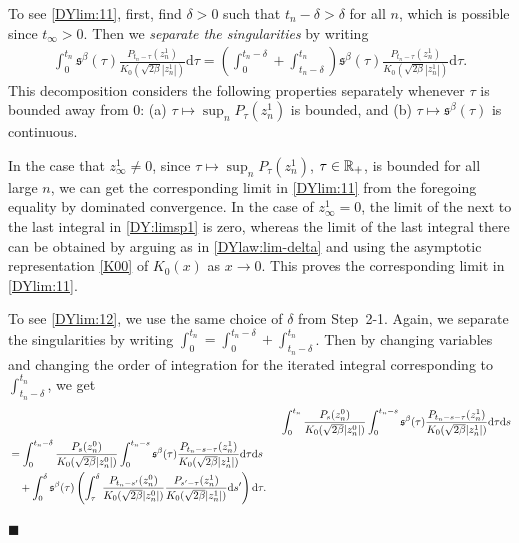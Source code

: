 \documentclass[12pt, twoside]{article}
\numberwithin{figure}{section}
\newcommand{\1}{\mathds 1}
\renewcommand{\d}{{\mathrm d}}
\newcommand{\R}{{\Bbb R}}
\newcommand{\2}{{\mathbf 1}}
\newcommand{\s}{{\mathfrak s}}
\renewenvironment{proof}[1][\proofname]{\noindent {\bfseries #1.}\;}{\hfill\ensuremath{\blacksquare}\\}
\begin{document}
\begin{proof}[Proof of Theorem~\ref{thm:formulas}]
To see \eqref{DYlim:11}, first, find $\delta>0$ such that $t_n-\delta>\delta$ for all $n$, which is possible since $t_\infty>0$. Then we \emph{separate the singularities} by writing
\begin{align}\label{DY:limsp1}
\int_0^{t_n}\s^\beta(\tau)\frac{P_{t_n-\tau}(z^1_n)}{K_0(\sqrt{2\beta}|z^1_n|)}\d \tau
=\left(\int_0^{t_n-\delta}
+\int_{t_n-\delta}^{t_n}\right)\s^\beta(\tau)\frac{P_{t_n-\tau}(z^1_n)}{K_0(\sqrt{2\beta}|z^1_n|)}\d \tau.
\end{align}
This decomposition considers the following properties separately whenever $\tau$ is bounded away from $0$: (a) $\tau\mapsto \sup_nP_{\tau}(z^1_n)$ is bounded, and (b) $\tau\mapsto \s^\beta(\tau)$ is continuous. 

In the case that $z^1_\infty\neq 0$, since $\tau\mapsto \sup_nP_\tau(z^1_n)$, $\tau\in \R_+$, is bounded for all large $n$, we can get the corresponding limit in \eqref{DYlim:11} from the foregoing equality by dominated convergence. In the case of $z^1_\infty=0$, the limit of the next to the last integral in \eqref{DY:limsp1} is zero, whereas the limit of the last integral there can be obtained by arguing as in \eqref{DYlaw:lim-delta} and using the asymptotic representation \eqref{K00} of $K_0(x)$ as $x\to 0$. This proves the corresponding limit in \eqref{DYlim:11}. \smallskip

 To see \eqref{DYlim:12}, we use the same choice of $\delta$ from Step~2-1. Again, we separate the singularities by writing $\int_0^{t_n}=\int_0^{t_n-\delta}+\int_{t_n-\delta}^{t_n}$. Then by changing variables and changing the order of integration for the iterated integral corresponding to $\int_{t_n-\delta}^{t_n}$, we get
\begin{align}
 &\quad\;\int_0^{t_n} \frac{P_{s}( z_n^0)}{K_0(\sqrt{2\beta}|z_n^0|)}\int_0^{t_n-s}\s^\beta(\tau)  \frac{P_{t_n-s-\tau}(z_n^1)}{K_0(\sqrt{2\beta }|z_n^1|)}
\d \tau\d s\notag\\
\begin{split}\label{DYlim:122}
&= \int_0^{t_n-\delta} \frac{P_{s}( z_n^0)}{K_0(\sqrt{2\beta}|z_n^0|)}\int_0^{t_n-s}\s^\beta(\tau)  \frac{P_{t_n-s-\tau}(z_n^1)}{K_0(\sqrt{2\beta }|z_n^1|)}
\d \tau\d s\\
&\quad +\int_0^{\delta}\s^\beta(\tau) \left(\int_{\tau}^{\delta} \frac{P_{t_n-s'}( z_n^0)}{K_0(\sqrt{2\beta}|z_n^0|)} \frac{P_{s'-\tau}(z_n^1)}{K_0(\sqrt{2\beta }|z_n^1|)}
\d s'\right)\d \tau.
\end{split}
\end{align}


\end{proof}
\end{document}
